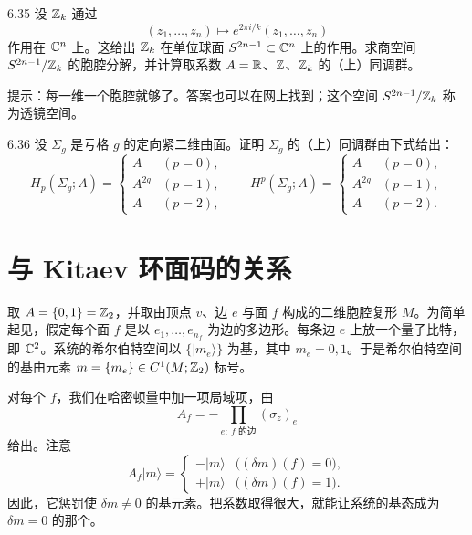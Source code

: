 \begin{question}{6.35}
  设 $\mathbb{Z}_k$ 通过
  \begin{equation}
    (z_1,\dots,z_n)\mapsto e^{2\pi i/k}(z_1,\dots,z_n)
    \tag{6.24}
  \end{equation}
  作用在 $\mathbb{C}^n$ 上。这给出 $\mathbb{Z}_k$ 在单位球面 $S^{2n-1}\subset\mathbb{C}^n$ 上的作用。求商空间 $S^{2n-1}/\mathbb{Z}_k$ 的胞腔分解，并计算取系数 $A=\mathbb{R}$、$\mathbb{Z}$、$\mathbb{Z}_k$ 的（上）同调群。
\end{question}

提示：每一维一个胞腔就够了。答案也可以在网上找到；这个空间 $S^{2n-1}/\mathbb{Z}_k$ 称为透镜空间。

\begin{question}{6.36}
  设 $\Sigma_g$ 是亏格 $g$ 的定向紧二维曲面。证明 $\Sigma_g$ 的（上）同调群由下式给出：
  \begin{equation}
    H_p(\Sigma_g;A)=
    \begin{cases}
      A & (p=0),\\
      A^{2g} & (p=1),\\
      A & (p=2),
    \end{cases}
    \qquad
    H^p(\Sigma_g;A)=
    \begin{cases}
      A & (p=0),\\
      A^{2g} & (p=1),\\
      A & (p=2).
    \end{cases}
    \tag{6.25}
  \end{equation}
\end{question}


\section{与 Kitaev 环面码的关系}

取 $A=\{0,1\}=\mathbb{Z}_2$，并取由顶点 $v$、边 $e$ 与面 $f$ 构成的二维胞腔复形 $M$。为简单起见，假定每个面 $f$ 是以 $e_1,\dots,e_{n_f}$ 为边的多边形。每条边 $e$ 上放一个量子比特，即 $\mathbb{C}^2$。系统的希尔伯特空间以 $\{|m_e\rangle\}$ 为基，其中 $m_e=0,1$。于是希尔伯特空间的基由元素 $m=\{m_e\}\in C^1(M;\mathbb{Z}_2)$ 标号。

对每个 $f$，我们在哈密顿量中加一项局域项，由
\begin{equation}
  A_f=-\prod_{e:\ \text{$f$ 的边}}(\sigma_z)_e
  \tag{6.26}
\end{equation}
给出。注意
\begin{equation}
  A_f|m\rangle=
  \begin{cases}
    -|m\rangle & \bigl((\delta m)(f)=0\bigr),\\
    +|m\rangle & \bigl((\delta m)(f)=1\bigr).
  \end{cases}
  \tag{6.27}
\end{equation}
因此，它惩罚使 $\delta m\ne0$ 的基元素。把系数取得很大，就能让系统的基态成为 $\delta m=0$ 的那个。

